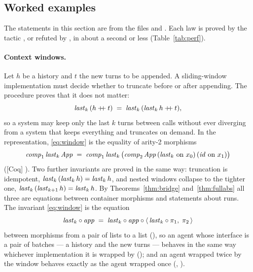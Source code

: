 \documentclass{fundam}
\begin{document}
\subsection{Worked examples}\label{sec:worked}

The statements in this section are from the files  and
.  Each law is proved by the tactic , or refuted by
, in about a second or less (Table~\ref{tab:perf}).

\paragraph{Context windows.}  Let $h$ be a history and $t$ the new turns to be appended.
A sliding-window implementation must decide whether to truncate before or after
appending.  The procedure proves that it does not matter:
\begin{equation}\label{eq:window}
  \mathit{last}_k\,(h \mathbin{+\!\!+} t) \;=\; \mathit{last}_k\,(\mathit{last}_k\,h \mathbin{+\!\!+} t),
\end{equation}
so a system may keep only the last $k$ turns between calls without ever diverging from a
system that keeps everything and truncates on demand.  In the representation,
\eqref{eq:window} is the equality of arity-2 morphisms
\[
  \mathit{comp}_1\,\mathit{last}_k\,\mathit{App} \;=\; \mathit{comp}_1\,\mathit{last}_k\,\big(\mathit{comp}_2\,\mathit{App}\,(\mathit{last}_k \text{ on } x_0)\,(\mathit{id} \text{ on } x_1)\big)
\]
(\textsf{[Coq]} ).  Two further invariants are proved in the same way:
truncation is idempotent, $\mathit{last}_k\,(\mathit{last}_k\,h) = \mathit{last}_k\,h$, and nested windows collapse
to the tighter one, $\mathit{last}_k\,(\mathit{last}_{k+1}\,h) = \mathit{last}_k\,h$.  By
Theorems~\ref{thm:bridge} and~\ref{thm:fullabs} all three are equations between container
morphisms and statements about runs.  The invariant \eqref{eq:window} is the equation
\[
  \mathit{last}_k \circ \mathit{app} \;=\;
  \mathit{last}_k \circ \mathit{app} \circ \langle\, \mathit{last}_k \circ \pi_1,\; \pi_2 \,\rangle
\]
between morphisms from a pair of lists to a list (), so an agent
whose interface is a pair of batches --- a history and the new turns --- behaves in the
same way whichever implementation it is wrapped by (); and an
agent wrapped twice by the window behaves exactly as the agent wrapped once
(, ).
\end{document}
